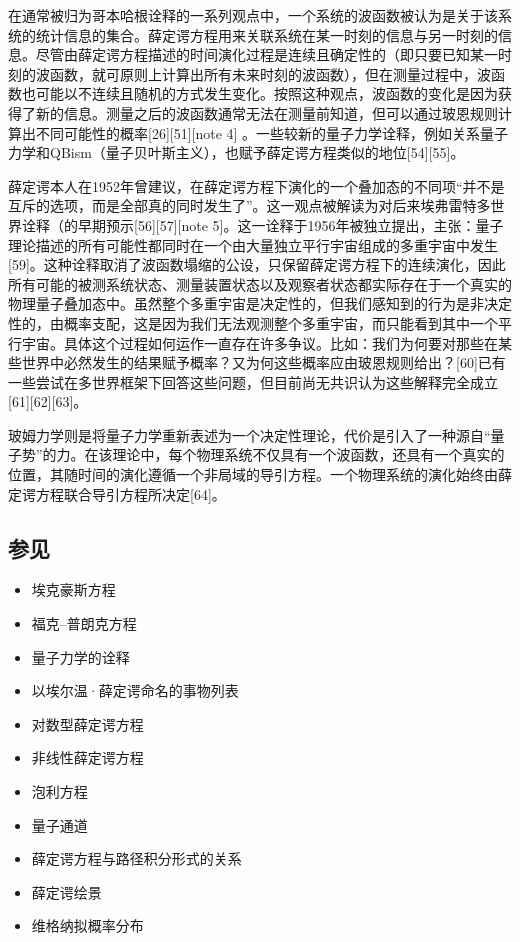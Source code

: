 在通常被归为哥本哈根诠释的一系列观点中，一个系统的波函数被认为是关于该系统的统计信息的集合。薛定谔方程用来关联系统在某一时刻的信息与另一时刻的信息。尽管由薛定谔方程描述的时间演化过程是连续且确定性的（即只要已知某一时刻的波函数，就可原则上计算出所有未来时刻的波函数），但在测量过程中，波函数也可能以不连续且随机的方式发生变化。按照这种观点，波函数的变化是因为获得了新的信息。测量之后的波函数通常无法在测量前知道，但可以通过玻恩规则计算出不同可能性的概率[26][51][note 4] 。一些较新的量子力学诠释，例如关系量子力学和QBism（量子贝叶斯主义），也赋予薛定谔方程类似的地位[54][55]。

薛定谔本人在1952年曾建议，在薛定谔方程下演化的一个叠加态的不同项“并不是互斥的选项，而是全部真的同时发生了”。这一观点被解读为对后来埃弗雷特多世界诠释（的早期预示[56][57][note 5]。这一诠释于1956年被独立提出，主张：量子理论描述的所有可能性都同时在一个由大量独立平行宇宙组成的多重宇宙中发生[59]。这种诠释取消了波函数塌缩的公设，只保留薛定谔方程下的连续演化，因此所有可能的被测系统状态、测量装置状态以及观察者状态都实际存在于一个真实的物理量子叠加态中。虽然整个多重宇宙是决定性的，但我们感知到的行为是非决定性的，由概率支配，这是因为我们无法观测整个多重宇宙，而只能看到其中一个平行宇宙。具体这个过程如何运作一直存在许多争议。比如：我们为何要对那些在某些世界中必然发生的结果赋予概率？又为何这些概率应由玻恩规则给出？[60]已有一些尝试在多世界框架下回答这些问题，但目前尚无共识认为这些解释完全成立[61][62][63]。

玻姆力学则是将量子力学重新表述为一个决定性理论，代价是引入了一种源自“量子势”的力。在该理论中，每个物理系统不仅具有一个波函数，还具有一个真实的位置，其随时间的演化遵循一个非局域的导引方程。一个物理系统的演化始终由薛定谔方程联合导引方程所决定[64]。
\subsection{参见}
\begin{itemize}
\item 埃克豪斯方程
\item 福克–普朗克方程
\item 量子力学的诠释
\item 以埃尔温·薛定谔命名的事物列表
\item 对数型薛定谔方程
\item 非线性薛定谔方程
\item 泡利方程
\item 量子通道
\item 薛定谔方程与路径积分形式的关系
\item 薛定谔绘景
\item 维格纳拟概率分布
\end{itemize}
